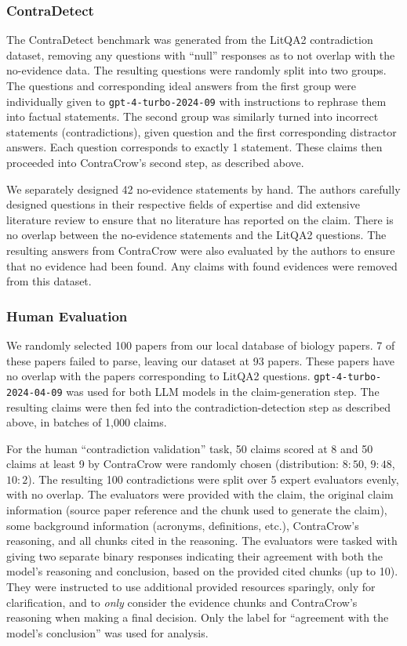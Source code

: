 \documentclass{article}
\begin{document}
\subsubsection{ContraDetect} \label{sec:cc-contradetect}
The ContraDetect benchmark was generated from the LitQA2 contradiction dataset, removing any questions with ``null'' responses as to not overlap with the no-evidence data. The resulting questions were randomly split into two groups. The questions and corresponding ideal answers from the first group were individually given to \texttt{gpt-4-turbo-2024-09}\cite{achiam2023gpt} with instructions to rephrase them into factual statements. The second group was similarly turned into incorrect statements (contradictions), given question and the first corresponding distractor answers. Each question corresponds to exactly 1 statement. These claims then proceeded into ContraCrow's second step, as described above.

We separately designed 42 no-evidence statements by hand. The authors carefully designed questions in their respective fields of expertise and did extensive literature review to ensure that no literature has reported on the claim. There is no overlap between the no-evidence statements and the LitQA2 questions. The resulting answers from ContraCrow were also evaluated by the authors to ensure that no evidence had been found. Any claims with found evidences were removed from this dataset. 

\subsubsection{Human Evaluation} \label{sec:cc-eval}
We randomly selected 100 papers from our local database of biology papers. 7 of these papers failed to parse, leaving our dataset at 93 papers. These papers have no overlap with the papers corresponding to LitQA2 questions. \texttt{gpt-4-turbo-2024-04-09}\cite{achiam2023gpt} was used for both LLM models in the claim-generation step. The resulting claims were then fed into the contradiction-detection step as described above, in batches of 1,000 claims.

For the human ``contradiction validation'' task, 50 claims scored at 8 and 50 claims at least 9 by ContraCrow were randomly chosen (distribution: $8:50$, $9:48$, $10:2$). The resulting 100 contradictions were split over 5 expert evaluators evenly, with no overlap. The evaluators were provided with the claim, the original claim information (source paper reference and the chunk used to generate the claim), some background information (acronyms, definitions, etc.), ContraCrow's reasoning, and all chunks cited in the reasoning. The evaluators were tasked with giving two separate binary responses indicating their agreement with both the model's reasoning and conclusion, based on the provided cited chunks (up to 10). They were instructed to use additional provided resources sparingly, only for clarification, and to \textit{only} consider the evidence chunks and ContraCrow's reasoning when making a final decision. Only the label for ``agreement with the model's conclusion'' was used for analysis. 
\end{document}
